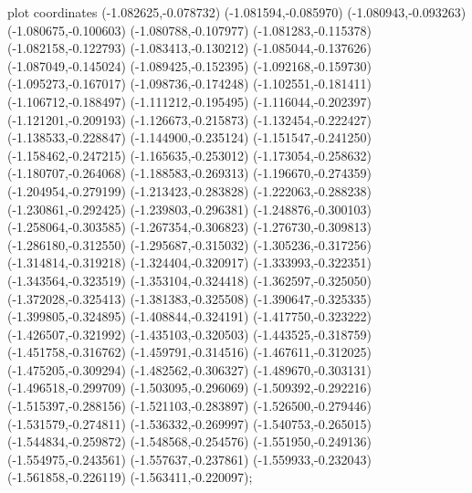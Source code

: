 { plot coordinates {(-1.082625,-0.078732) (-1.081594,-0.085970) (-1.080943,-0.093263) (-1.080675,-0.100603) (-1.080788,-0.107977) (-1.081283,-0.115378) (-1.082158,-0.122793) (-1.083413,-0.130212) (-1.085044,-0.137626) (-1.087049,-0.145024) (-1.089425,-0.152395) (-1.092168,-0.159730) (-1.095273,-0.167017) (-1.098736,-0.174248) (-1.102551,-0.181411) (-1.106712,-0.188497) (-1.111212,-0.195495) (-1.116044,-0.202397) (-1.121201,-0.209193) (-1.126673,-0.215873) (-1.132454,-0.222427) (-1.138533,-0.228847) (-1.144900,-0.235124) (-1.151547,-0.241250) (-1.158462,-0.247215) (-1.165635,-0.253012) (-1.173054,-0.258632) (-1.180707,-0.264068) (-1.188583,-0.269313) (-1.196670,-0.274359) (-1.204954,-0.279199) (-1.213423,-0.283828) (-1.222063,-0.288238) (-1.230861,-0.292425) (-1.239803,-0.296381) (-1.248876,-0.300103) (-1.258064,-0.303585) (-1.267354,-0.306823) (-1.276730,-0.309813) (-1.286180,-0.312550) (-1.295687,-0.315032) (-1.305236,-0.317256) (-1.314814,-0.319218) (-1.324404,-0.320917) (-1.333993,-0.322351) (-1.343564,-0.323519) (-1.353104,-0.324418) (-1.362597,-0.325050) (-1.372028,-0.325413) (-1.381383,-0.325508) (-1.390647,-0.325335) (-1.399805,-0.324895) (-1.408844,-0.324191) (-1.417750,-0.323222) (-1.426507,-0.321992) (-1.435103,-0.320503) (-1.443525,-0.318759) (-1.451758,-0.316762) (-1.459791,-0.314516) (-1.467611,-0.312025) (-1.475205,-0.309294) (-1.482562,-0.306327) (-1.489670,-0.303131) (-1.496518,-0.299709) (-1.503095,-0.296069) (-1.509392,-0.292216) (-1.515397,-0.288156) (-1.521103,-0.283897) (-1.526500,-0.279446) (-1.531579,-0.274811) (-1.536332,-0.269997) (-1.540753,-0.265015) (-1.544834,-0.259872) (-1.548568,-0.254576) (-1.551950,-0.249136) (-1.554975,-0.243561) (-1.557637,-0.237861) (-1.559933,-0.232043) (-1.561858,-0.226119) (-1.563411,-0.220097)};
}
